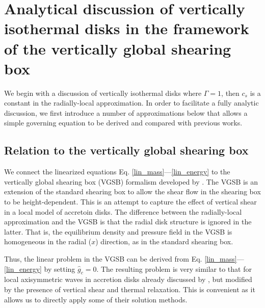 \section{Analytical discussion of vertically isothermal
  disks in the framework of the vertically global shearing
  box}\label{analytical}  
We begin with a discussion of vertically isothermal disks
where $\Gamma=1$, then $c_s$ is a constant in the radially-local
approximation. %
In order to facilitate a fully analytic discussion, we first introduce a
number of approximations below that allows a simple governing equation
to be derived and compared with previous works.  

\subsection{Relation to the vertically global
  shearing box} 
We connect the linearized equations 
Eq. \ref{lin_mass}---\ref{lin_energy} to the vertically global  
shearing box (VGSB) formalism developed by \cite{mcnally14}. The VGSB
is an extension of the standard shearing box \citep{goldreich65} to
allow the shear flow in the shearing box to be height-dependent. This
is an attempt to capture the effect of vertical shear in a local model
of accretoin disks. The difference between the radially-local
approximation and the VGSB is that the radial disk structure is
ignored in the latter. That is, the  equilibrium density and pressure
field in the VGSB is homogeneous in the radial ($x$) direction, as in
the standard shearing box.    

Thus, the linear problem in the VGSB can be derived from
Eq. \ref{lin_mass}---\ref{lin_energy} by setting 
$\hat{g}_c=0$. The resulting problem is very similar 
to that for local axisymmetric waves in accretion disks already
discussed by \cite{lubow93}, but modified by the presence of vertical
shear and thermal relaxation. This is convenient as it allows us to
directly apply some of their solution methods.    


